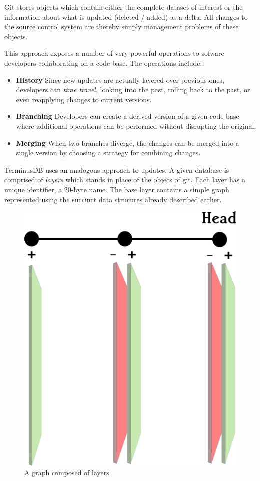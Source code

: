 \documentclass[10pt, a4paper, twocolumn]{article} %
\begin{document}
Git stores objects which contain either the complete dataset of
interest or the information about what is updated (deleted / added) as
a delta. All changes to the source control system are thereby simply
management problems of these objects.

This approach exposes a number of very powerful operations to sofware
developers collaborating on a code base. The operations include:

\begin{itemize}
\item {\bf History} Since new updates are actually layered over previous
  ones, developers can {\em time travel}, looking into the past,
  rolling back to the past, or even reapplying changes to current
  versions.
\item {\bf Branching} Developers can create a derived version of a given
  code-base where additional operations can be performed without
  disrupting the original.
\item {\bf Merging} When two branches diverge, the changes can be merged
  into a single version by choosing a strategy for combining changes.
\end{itemize}

TerminusDB uses an analogous approach to updates. A given database is
comprised of {\em layers} which stands in place of the objecs of
git. Each layer has a unique identifier, a 20-byte name. The base
layer contains a simple graph represented using the succinct data
strucures already described earlier.

\begin{figure}
	\includegraphics[width=\linewidth]{layers-diagram.png} %
	\caption{A graph composed of layers} %
	\label{fig:layers} %
\end{figure}
\end{document}
